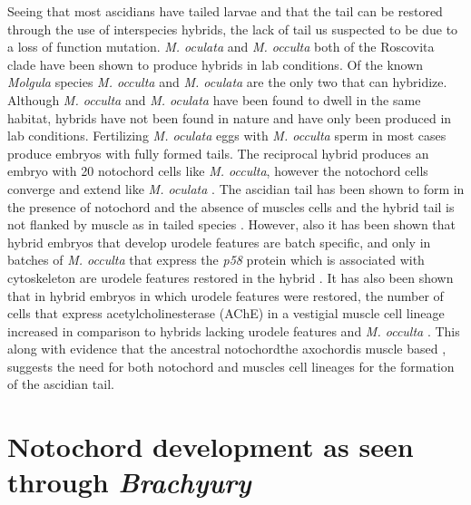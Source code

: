 Seeing that most ascidians have tailed larvae and that the tail can be restored through the use of interspecies hybrids, the lack of tail us suspected to be due to a loss of function mutation. \textit{M. oculata} and \textit{M. occulta} both of the Roscovita clade have been shown to produce hybrids in lab conditions. Of the known \textit{Molgula} species \textit{M. occulta} and \textit{M. oculata} are the only two that can hybridize. Although \textit{M. occulta} and \textit{M. oculata} have been found to dwell in the same habitat, hybrids have not been found in nature and have only been produced in lab conditions. Fertilizing \textit{M. oculata} eggs with \textit{M. occulta} sperm in most cases produce embryos with fully formed tails. The reciprocal hybrid produces an embryo with 20 notochord cells like \textit{M. occulta}, however the notochord cells converge and extend like \textit{M. oculata} \cite{swalla_interspecific_1990}. The ascidian tail has been shown to form in the presence of notochord and the absence of muscles cells \cite{miyamoto_formation_1985} and the hybrid tail is not flanked by muscle as in tailed species \cite{swalla_novel_1993}. However, also it has been shown that hybrid embryos that develop urodele features are batch specific, and only in batches of \textit{M. occulta} that express the \textit{p58} protein which is associated with cytoskeleton are urodele features restored in the hybrid \cite{swalla_identification_1991,jeffery_factors_1992}. It has also been shown that in hybrid embryos in which urodele features were restored, the number of cells that express acetylcholinesterase (AChE) in a vestigial muscle cell lineage increased in comparison to hybrids lacking urodele features and \textit{M. occulta} \cite{jeffery_evolutionary_1991}. This along with evidence that the ancestral notochord\textemdash the axochord\textemdash is muscle based \cite{lauri_development_2014}, suggests the need for both notochord and muscles cell lineages for the formation of the ascidian tail. 

\section{Notochord development as seen through \textit{Brachyury}}

